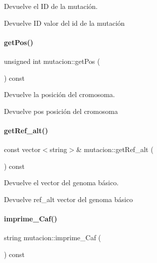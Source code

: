 Devuelve el ID de la mutación. 

\begin{DoxyReturn}{Devuelve}
ID valor del id de la mutación 
\end{DoxyReturn}
\hypertarget{classmutacion_ab11e8cb7dc7b07befe3ec4f7c48ee941}{}\label{classmutacion_ab11e8cb7dc7b07befe3ec4f7c48ee941} 
\paragraph{\texorpdfstring{get\+Pos()}{getPos()}}
{\footnotesize\ttfamily unsigned int mutacion\+::get\+Pos (\begin{DoxyParamCaption}{ }\end{DoxyParamCaption}) const}



Devuelve la posición del cromosoma. 

\begin{DoxyReturn}{Devuelve}
pos posición del cromosoma 
\end{DoxyReturn}
\hypertarget{classmutacion_a7ca5dbd9bbf12a7d581bffca550692cb}{}\label{classmutacion_a7ca5dbd9bbf12a7d581bffca550692cb} 
\paragraph{\texorpdfstring{get\+Ref\+\_\+alt()}{getRef\_alt()}}
{\footnotesize\ttfamily const vector$<$string$>$\& mutacion\+::get\+Ref\+\_\+alt (\begin{DoxyParamCaption}{ }\end{DoxyParamCaption}) const}



Devuelve el vector del genoma básico. 

\begin{DoxyReturn}{Devuelve}
ref\+\_\+alt vector del genoma básico 
\end{DoxyReturn}
\hypertarget{classmutacion_a820234fdc96bcce212c1ff3c2f42d084}{}\label{classmutacion_a820234fdc96bcce212c1ff3c2f42d084} 
\paragraph{\texorpdfstring{imprime\+\_\+\+Caf()}{imprime\_Caf()}}
{\footnotesize\ttfamily string mutacion\+::imprime\+\_\+\+Caf (\begin{DoxyParamCaption}{ }\end{DoxyParamCaption}) const}



